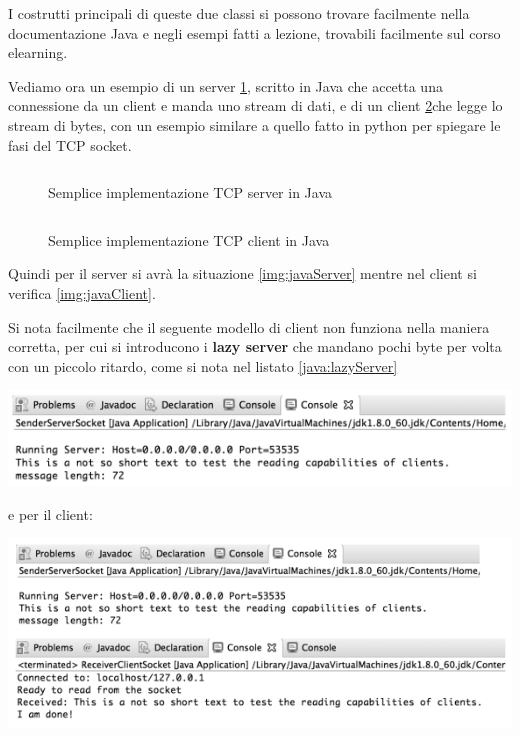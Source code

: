\documentclass[a4paper,12pt, oneside]{book}
\begin{document}
I costrutti principali di queste due classi si possono trovare facilmente nella documentazione Java 
e negli esempi fatti a lezione, trovabili facilmente sul corso elearning.

Vediamo ora un esempio di un server \ref{java:tcpServer}, scritto in Java che accetta una connessione da un client 
e manda uno stream di dati, e di un client \ref{java:tcpClient}che legge lo stream di bytes, 
con un esempio similare a quello fatto in python per spiegare le fasi del TCP socket.

\begin{figure}
    \caption{Semplice implementazione TCP server in Java}
    \label{java:tcpServer}
    \inputminted{java}{code/javaSocket/ServerWriter/SenderServerSocket.java}
\end{figure}

\begin{figure}
    \caption{Semplice implementazione TCP client in Java}
    \label{java:tcpClient}
    \inputminted{java}{code/javaSocket/ServerWriter/ReceiverClientSocket.java}
\end{figure}

Quindi per il server si avrà la situazione \ref{img:javaServer} mentre nel client 
si verifica \ref{img:javaClient}.

Si nota facilmente che il seguente modello di client non funziona nella maniera corretta, per cui
si introducono i \textbf{lazy server} che mandano pochi byte per volta con un piccolo ritardo,
come si nota nel listato \ref{java:lazyServer}

\begin{center}
	\includegraphics[scale=2.5]{img/sc5.png}
\end{center}
e per il client:
\begin{center}
	\includegraphics[scale=2.5]{img/sc6.png}
\end{center}
\end{document}

